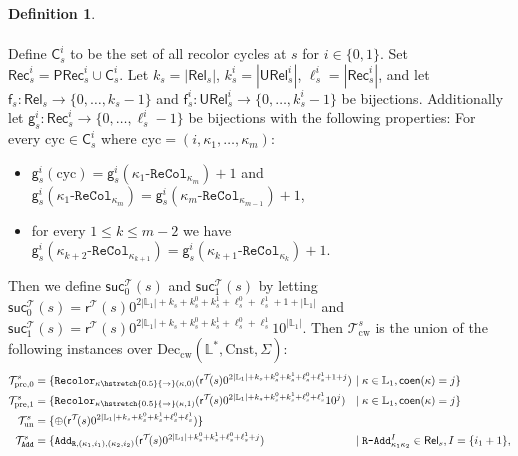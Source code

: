 \documentclass[10pt,a4paper]{amsart}
\theoremstyle{definition}
\numberwithin{equation}{section}
\theoremstyle{plain}
\theoremstyle{definition}
\newtheorem{definition}[definition]{Definition}
\theoremstyle{myexample}
\theoremstyle{plain}
\theoremstyle{definition}
\newcommand{\cols}{\mathbb{L}}
\newcommand{\radd}[4]{#4\pred{\texttt{-}Add}^{#3}_{#1#2}}
\newcommand{\recol}[2]{#2\pred{\texttt{-}ReCol}_{#1}}
\newcommand{\fcn}[1]{\mathsf{#1}}
\newcommand{\pred}[1]{\mathtt{#1}}
\newcommand{\rpred}{\pred{R}}
\newcommand{\shortto}{\hstretch{0.5}{\to}}
\begin{document}
\begin{definition}
\begin{itemize}
\begin{align*}
		\end{align*}
		Define $\fcn{C}_{s}^{i}$ to be the set of all recolor cycles at $s$ for $i\in\{ 0, 1\}$. Set $\fcn{Rec}^{i}_{s} = \fcn{PRec}^{i}_s \cup  \fcn{C}_{s}^{i}$.
		Let $k_s = |\fcn{Rel}_s|$, $k_s^{i} = |\fcn{URel}^{i}_{s}|$, $\ell_s^{i} = |\fcn{Rec}_s^{i}|$, and let $\fcn{f}_s\colon \fcn{Rel}_{s} \to \{ 0,\ldots, k_s-1 \}$ and $\fcn{f}_s^{i}\colon \fcn{URel}_{s}^{i} \to \{ 0,\ldots, k_s^{i}-1 \}$ be bijections. Additionally let $\fcn{g}_s^{i}\colon \fcn{Rec}_{s}^{i} \to \{ 0,\ldots, \ell_s^{i}-1 \}$ be bijections with the following properties: For every $\mathrm{cyc}\in\fcn{C}^{i}_s$ where $\mathrm{cyc} = (i, \kappa_1, \ldots, \kappa_m)$:
		\begin{itemize}
			\item $\fcn{g}^{i}_{s}(\mathrm{cyc}) = \fcn{g}^{i}_{s}(\recol{\kappa_{m}}{\kappa_{1}}) + 1$ and $\fcn{g}^{i}_{s}(\recol{\kappa_{m}}{\kappa_{1}}) =  \fcn{g}^{i}_{s}(\recol{\kappa_{m-1}}{\kappa_{m}}) + 1$, 
			\item for every $1 \le k\le m-2$ we have $\fcn{g}^{i}_{s}(\recol{\kappa_{k+1}}{\kappa_{k+2}}) = \fcn{g}^{i}_{s}(\recol{\kappa_{k}}{\kappa_{k+1}}) + 1$.
		\end{itemize}
		Then we define $\fcn{suc}^{\mathcal{T}}_0(s)$ and $\fcn{suc}^{\mathcal{T}}_1(s)$ by letting $\fcn{suc}^{\mathcal{T}}_0(s) = \fcn{r}^{\mathcal{T}}\!(s)0^{2|\cols_1| +k_s+k_s^0+k_s^1+\ell_s^0+\ell_s^1+1 + |\cols_1|}$ and $\fcn{suc}^{\mathcal{T}}_1(s) = \fcn{r}^{\mathcal{T}}\!(s)0^{2|\cols_1| +k_s+k_s^0+k_s^1+\ell_s^0+\ell_s^1}10^{|\cols_1|}$. Then $\mathcal{T}_{\mathrm{cw}}^{s}$ is the union of the following instances over $\mathrm{Dec}_{\mathrm{cw}}(\cols^*, \mathrm{Cnst}, \Sigma)$:\small
		\begin{align*}
			\mathcal{T}_{\mathrm{pre}, 0}^{s} &=  \{ \pred{Recolor}_{\kappa \shortto (\kappa, 0)}(\fcn{r}^{\mathcal{T}}\!(s)0^{2|\cols_1| +k_s+k_s^0+k_s^1+\ell_s^0+\ell_s^1+1 + j}) \hspace{-3ex}&& \mid \kappa\in\cols_1, \fcn{coen}(\kappa) = j \} \\
			\mathcal{T}_{\mathrm{pre}, 1}^{s} &=  \{ \pred{Recolor}_{\kappa \shortto (\kappa, 1)}(\fcn{r}^{\mathcal{T}}\!(s)0^{2|\cols_1| + k_s+k_s^0+k_s^1+\ell_s^0+\ell_s^1}10^{j}) \!\! && \mid \kappa\in\cols_1, \fcn{coen}(\kappa) = j \} \\
			\mathcal{T}_{\mathrm{un}}^{s} & = \{ \oplus(\fcn{r}^{\mathcal{T}}\!(s)0^{2|\cols_1| +k_s+k_s^0+k_s^1+\ell_s^0+\ell_s^1}) \} &&\\
			\mathcal{T}_{\pred{Add}}^{s} &=  \{ \pred{Add}_{\rpred, (\kappa_1, i_1),(\kappa_2, i_2)}(\fcn{r}^{\mathcal{T}}\!(s)0^{2|\cols_1| + k_s^0+k_s^1+\ell_s^0+\ell_s^1+j}) &&\mid \radd{\kappa_1}{\kappa_2}{I}{\rpred}\in\fcn{Rel}_{s},I = \{i_1 +1 \}, \\[-1ex]

\end{align*}
\end{itemize}
\end{definition}
\end{document}
